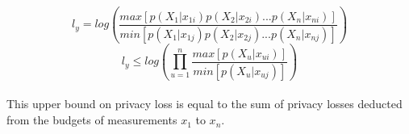 \documentclass[pageno]{jpaper}
\begin{document}
\begin{appendices}
\begin{equation} \label{eqn:ub_l_y_expanded}
  l_y = log\left( \frac{max[p(X_1 | x_{1i})p(X_2 | x_{2i})...p(X_n | x_{ni})]}{min[p(X_1 | x_{1j})p(X_2 | x_{2j})...p(X_n | x_{nj})]} \right) \nonumber
\end{equation}
\begin{equation} \label{eqn:ub_l_y_unconstrained}
  l_y \leq log\left( \prod_{u=1}^n \frac{max[p(X_u|x_{ui})]}{min[p(X_u|x_{uj})]} \right)
\end{equation}
\\
This upper bound on privacy loss is equal to the sum of privacy losses deducted from the budgets of measurements $x_1$ to $x_n$.
\end{appendices}
\end{document}

